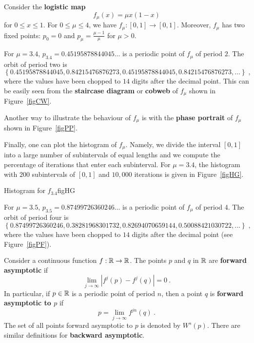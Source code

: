 \begin{egg}
Consider the {\bfseries logistic map}
\[
f_\mu(x) = \mu x(1-x)
\]
for $0\leq x \leq 1$.  For $0 \leq \mu \leq 4$, we have
$f_\mu:[0,1]\rightarrow [0,1]$.  Moreover, $f_\mu$ has two fixed
points: $p_0 = 0$ and
$\displaystyle p_{\mu} = \frac{\mu-1}{\mu}$ for $\mu > 0$.

For $\mu=3.4$, $p_{3.4} = 0.45195878844045\ldots$ is a periodic point of
$f_\mu$ of period $2$.  The orbit of period two is
\[
\left\{ 0.45195878844045, 0.84215476876273, 0.45195878844045,
0.84215476876273, \ldots \right\} \; ,
\]
where the values have been chopped
to $14$ digits after the decimal point.  This can be easily seen from the
{\bfseries staircase diagram} or
{\bfseries cobweb} of $f_\mu$ shown in Figure~\ref{figCW}.


Another way to illustrate the behaviour of $f_\mu$ is with the
{\bfseries phase portrait} of $f_\mu$ shown in
Figure~\ref{figPP}.


Finally, one can plot the histogram of $f_\mu$.  Namely, we divide
the interval $[0,1]$ into a large number of subintervals of equal
lengths and we compute the percentage of iterations that enter each
subinterval.  For $\mu=3.4$, the histogram with $200$ subintervals of
$[0,1]$ and $10,000$ iterations is given in Figure~\ref{figHG}.

{Histogram for $f_{3.4}$}{figHG}

For $\mu=3.5$, $p_{3.5} = 0.87499726360246\ldots$ is a periodic point of
$f_\mu$ of period $4$.  The orbit of period four is
\[
\left\{0.87499726360246, 0.38281968301732, 0.82694070659144,
0.50088421030722, \ldots \right\} \; ,
\]
where the values have been chopped
to $14$ digits after the decimal point (see Figure~\ref{figPF}).

\label{EggLogMap1}
\end{egg}

\begin{defn}
Consider a continuous function $f:\mathbb{R} \rightarrow \mathbb{R}$.  The points
$p$ and $q$ in $\mathbb{R}$ are
{\bfseries forward asymptotic} if
\[
\lim_{j\rightarrow \infty} \left| f^j(p) - f^j(q) \right| = 0 \ .
\]
In particular, if $p \in \mathbb{R}$ is a periodic point of period $n$, then a
point $q$ is
{\bfseries forward asymptotic to $p$} if
\[
p = \lim_{j\rightarrow \infty} f^{jn}(q) \  .
\]
The set of all points forward asymptotic to $p$ is denoted by $W^s(p)$.
There are similar definitions for
{\bfseries backward asymptotic}.
\end{defn}

